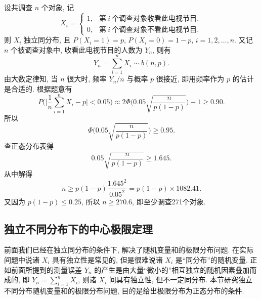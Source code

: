 \begin{solution}
    设共调查 $n$ 个对象, 记
    \begin{equation*}
        X_i =
        \begin{cases}
            1, & \text{第} \ i \ \text{个调查对象收看此电视节目},\\
            0, & \text{第} \ i \ \text{个调查对象不看此电视节目},
        \end{cases}
    \end{equation*}
    则 $ X_i $ 独立同分布, 且 $ P (X_i = 1) = p $, $ P (X_i = 0) = 1 - p $, $ i =1, 2, \dotsc, n $.
    又记 $ n $ 个被调查对象中, 收看此电视节目的人数为 $ Y_n $, 则有
    \begin{equation*}
        Y_n = \sum_{i=1}^n X_i \sim b (n, p).
    \end{equation*}
    由大数定律知, 当 $ n $ 很大时, 频率 $ Y_n / n $ 与概率 $ p $ 很接近, 即用频率作为 $ p $ 的估计是合适的.
    根据题意有
    \begin{equation*}
        P \biggl( \biggl\lvert \frac{1}{n} \sum_{i=1}^n X_i - p \biggr\rvert < 0.05 \biggr)
        \approx 2 \Phi \biggl( 0.05 \sqrt{\frac{n}{p (1 - p)}} \biggr) - 1
        \geq 0.90.
    \end{equation*}
    所以
    \begin{equation*}
        \Phi \biggl( 0.05 \sqrt{\frac{n}{p (1 - p)}} \biggr) \geq 0.95.
    \end{equation*}
    查正态分布表得
    \begin{equation*}
        0.05 \sqrt{\frac{n}{p (1 - p)}} \geq 1.645.
    \end{equation*}
    从中解得
    \begin{equation*}
        n \geq p (1 - p) \frac{1.645^2}{0.05^2} = p (1 - p) \times 1082.41.
    \end{equation*}
    又因为 $ p (1-p) \leq 0.25 $, 所以 $ n \geq 270.6 $, 即至少调查271个对象.
\end{solution}

\subsection{独立不同分布下的中心极限定理}

前面我们已经在独立同分布的条件下, 解决了随机变量和的极限分布问题.
在实际间题中说诸 $ X_i $ 具有独立性是常见的, 但是很难说诸 $ X_i $ 是``同分布''的随机变量.
正如前面所提到的测量误差 $ Y_n $ 的产生是由大量``微小的''相互独立的随机因素叠加而成的, 即 $ Y_n = \sum_{i=1}^n X_i $, 则诸 $ X_i $ 间具有独立性, 但不一定同分布.
本节研究独立不同分布随机变量和的极限分布问题, 目的是给出极限分布为正态分布的条件.

